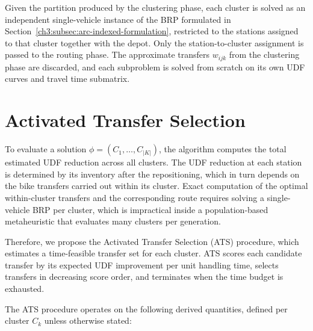 Given the partition produced by the clustering phase, each cluster is solved as an independent single-vehicle instance of the BRP formulated in Section~\ref{ch3:subsec:arc-indexed-formulation}, restricted to the stations assigned to that cluster together with the depot. Only the station-to-cluster assignment is passed to the routing phase. The approximate transfers $w_{ijk}$ from the clustering phase are discarded, and each subproblem is solved from scratch on its own UDF curves and travel time submatrix.

\section{Activated Transfer Selection}\label{ch3:sec:ats}

To evaluate a solution $\phi =({{C}_{1}},\ldots ,{{C}_{\left| K \right|}})$, the algorithm computes the total estimated UDF reduction across all clusters. The UDF reduction at each station is determined by its inventory after the repositioning, which in turn depends on the bike transfers carried out within its cluster. Exact computation of the optimal within-cluster transfers and the corresponding route requires solving a single-vehicle BRP per cluster, which is impractical inside a population-based metaheuristic that evaluates many clusters per generation.

Therefore, we propose the Activated Transfer Selection (ATS) procedure, which estimates a time-feasible transfer set for each cluster. ATS scores each candidate transfer by its expected UDF improvement per unit handling time, selects transfers in decreasing score order, and terminates when the time budget is exhausted.

The ATS procedure operates on the following derived quantities, defined per cluster ${{C}_{k}}$ unless otherwise stated:

